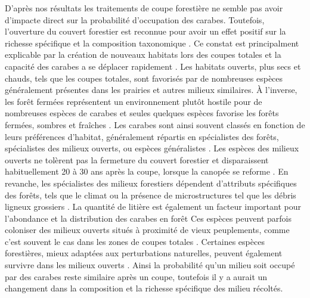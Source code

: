 D'après nos résultats les traitements de coupe forestière ne semble pas avoir d'impacte direct sur la probabilité d'occupation des carabes.
Toutefois, l'ouverture du couvert forestier est reconnue pour avoir un effet positif sur la richesse spécifique et la composition taxonomique \citep{Halme1993Carabidbeetles,Heliola2001Distributioncarabid,Koivula2002Alternativeharvesting}.
Ce constat est principalment explicable par la création de nouveaux habitats lors des coupes totales et la capacité des carabes a se déplacer rapidement \citep{Niemela2007effectsforestry}. 
Les habitats ouverts, plus secs et chauds, tels que les coupes totales, sont favorisés par de nombreuses espèces généralement présentes dans les prairies et autres milieux similaires. 
À l'inverse, les forêt fermées représentent un environnement plutôt hostile pour de nombreuses espèces de carabes et seules quelques espèces favorise les forêts fermées, sombres et fraîches \citep{Niemela1993Effectsclearcut,koivulaBorealCarabidbeetleColeoptera2002a}.
Les carabes sont ainsi souvent classés en fonction de leurs préférences d'habitat, généralement répartis en spécialistes des forêts, spécialistes des milieux ouverts, ou espèces généralistes \citep{Niemela2007effectsforestry}. 
Les espèces des milieux ouverts ne tolèrent pas la fermeture du couvert forestier et disparaissent habituellement 20 à 30 ans après la coupe, lorsque la canopée se reforme \citep{Niemela1996importancesmallscale,Koivula2002Alternativeharvesting}.  
En revanche, les spécialistes des milieux forestiers dépendent d'attributs spécifiques des forêts, tels que le climat ou la présence de microstructures tel que les débris ligneux grossiers \citep{Niemela1996importancesmallscale,Heliola2001Distributioncarabid,Koivula2002Alternativeharvesting,Work2004Standcomposition}. 
La quantité de litière est également un facteur important pour l'abondance et la distribution des carabes en forêt \citep{koivula.LeafLitterSmallscale1999,Heliola2001Distributioncarabid,Magura2005ImpactsLeaflitter}
Ces espèces peuvent parfois coloniser des milieux ouverts situés à proximité de vieux peuplements, comme c’est souvent le cas dans les zones de coupes totales \citep{Spence1996Northernforestry,Koivula2002Alternativeharvesting}. 
Certaines espèces forestières, mieux adaptées aux perturbations naturelles, peuvent également survivre dans les milieux ouverts \citep{Niemela2007effectsforestry}. 
Ainsi la probabilité qu'un milieu soit occupé par des carabes reste similaire après un coupe, toutefois il y a aurait un changement dans la composition et la richesse spécifique des milieu récoltés. 

